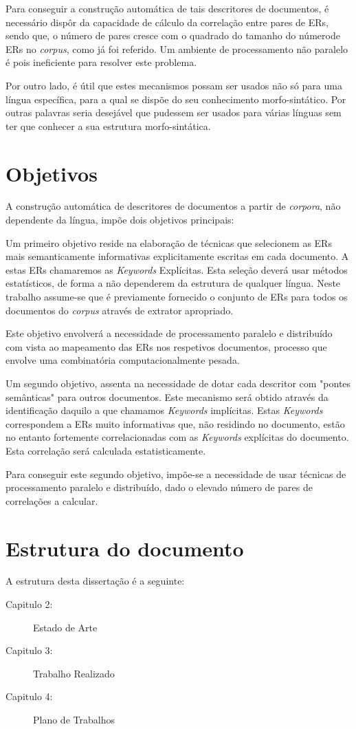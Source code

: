 Para conseguir a construção automática de tais descritores de documentos, é necessário dispôr da capacidade de cálculo da correlação entre pares de ERs, sendo que, o número de pares cresce com o quadrado do tamanho do númerode ERs no \textit{corpus}, como já foi referido. Um ambiente de processamento não paralelo é pois ineficiente para resolver este problema.

Por outro lado, é útil que estes mecanismos possam ser usados não só para uma língua específica, para a qual se dispõe do seu conhecimento morfo-sintático. Por outras palavras seria desejável que pudessem ser usados para várias línguas sem ter que conhecer a sua estrutura morfo-sintática.

\section{Objetivos}
A construção automática de descritores de documentos a partir de \textit{corpora}, não dependente da língua, impõe dois objetivos principais:

Um primeiro objetivo reside na elaboração de técnicas que selecionem as ERs mais semanticamente informativas explicitamente escritas em cada documento. A estas ERs chamaremos as \textit{Keywords} Explícitas. Esta seleção deverá usar métodos estatísticos, de forma a não dependerem da estrutura de qualquer língua. Neste trabalho assume-se que é previamente fornecido o conjunto de ERs para todos os documentos do \textit{corpus} através de extrator apropriado.

Este objetivo envolverá a necessidade de processamento paralelo e distribuído com vista ao mapeamento das ERs nos respetivos documentos, processo que envolve uma combinatória computacionalmente pesada.

Um segundo objetivo, assenta na necessidade de dotar cada descritor com "pontes semânticas" para outros documentos. Este mecanismo será obtido através da identificação daquilo a que chamamos \textit{Keywords} implícitas. Estas \textit{Keywords} correspondem a ERs muito informativas que, não residindo no documento, estão no entanto fortemente correlacionadas com as \textit{Keywords} explícitas do documento. Esta correlação será calculada estatisticamente.

Para conseguir este segundo objetivo, impõe-se a necessidade de usar técnicas de processamento paralelo e distribuído, dado o elevado número de pares de correlações a calcular.

\section{Estrutura do documento}
A estrutura desta dissertação é a seguinte: 
    \begin{description}
        \item[Capitulo 2:] Estado de Arte
        \item[Capitulo 3:] Trabalho Realizado
        \item[Capitulo 4:] Plano de Trabalhos
    \end{description}